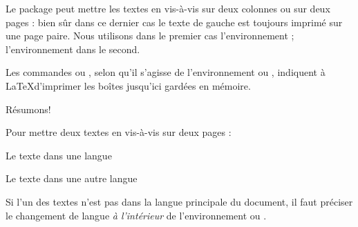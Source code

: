 Le package  peut mettre les textes en vis-à-vis sur deux colonnes ou sur deux pages  : bien sûr dans ce dernier  cas le texte de gauche est toujours imprimé sur une page paire.
Nous utilisons dans le premier cas l'environnement  ; l'environnement  dans le second.

Les commandes  ou , selon qu'il s'agisse de l'environnement  ou , indiquent à \LaTeX  d'imprimer les boîtes jusqu'ici gardées en mémoire. 



Résumons!

Pour mettre deux textes en vis-à-vis sur deux pages :

\begin{latexcode}

\begin{pages}  %
\begin{Leftside} %
\beginnumbering %
\pstart %
 
Le texte dans une langue 
 
\pend
\endnumbering  %
\end{Leftside} %
 
\begin{Rightside}  %
\beginnumbering
\pstart
 
Le texte dans une autre langue
 
\pend
\endnumbering
\end{Rightside} 
\Pages

\end{pages} %
\end{latexcode}

\begin{attention}
Si l'un des textes n'est pas dans la langue principale du document, il faut préciser le changement de langue \emph{à l'intérieur} de l'environnement  ou .

\begin{latexcode}
\begin{Leftside}
\begin{<langue>}
\end{<langue>}
\end{Leftside}
\end{latexcode}
\end{attention}

